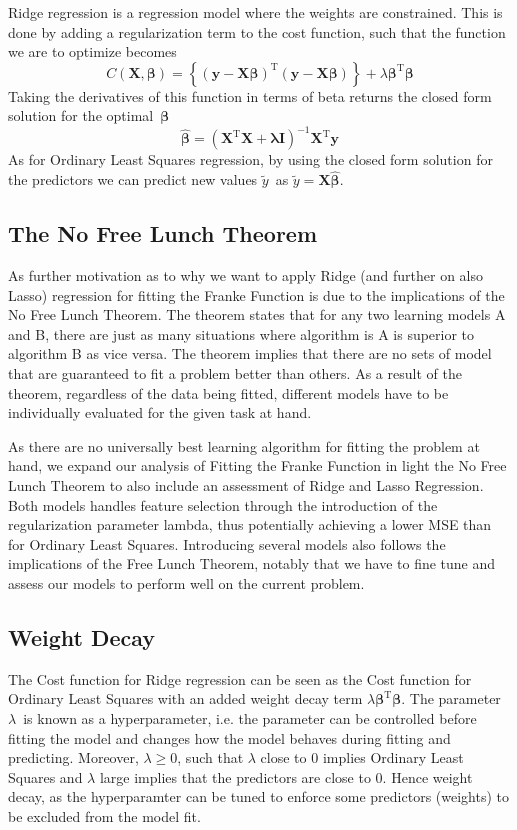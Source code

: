 \documentclass[11pt, a4paper]{article}
\begin{document}
Ridge regression is a regression model where the weights are constrained. \cite{Geron2019} This is done by adding a regularization term to the cost function, such that the function we are to optimize becomes
\[
  C\left(\bm{X},\bm{\beta}\right) = \left\{\left(\bm{y}-\bm{X}\bm{\beta}\right)^\text{T}\left(\bm{y}-\bm{X}\bm{\beta}\right)\right\}+\lambda\bm{\beta}^\text{T}\bm{\beta}
\]
Taking the derivatives of this function in terms of beta returns the closed form solution for the optimal $\bm{\beta}$
\[
  \bm{\hat{\beta}} = \left(\bm{X}^\text{T}\bm{X} + \bm{\lambda}\bm{I}\right)^{-1}\bm{X}^\text{T}\bm{y}
\]
As for Ordinary Least Squares regression, by using the closed form solution for the predictors we can predict new values $\tilde{y}$ as $\tilde{y} = \bm{X}\bm{\hat{\beta}}$.

\subsection*{The No Free Lunch Theorem}
As further motivation as to why we want to apply Ridge (and further on also Lasso) regression for fitting the Franke Function is due to the implications of the No Free Lunch Theorem. The theorem states that for any two learning models A and B, there are just as many situations where algorithm is A is superior to algorithm B as vice versa. \cite{Wolpert1996} The theorem implies that there are no sets of model that are guaranteed to fit a problem better than others. As a result of the theorem, regardless of the data being fitted, different models have to be individually evaluated for the given task at hand.

As there are no universally best learning algorithm for fitting the problem at hand, we expand our analysis of Fitting the Franke Function in light the No Free Lunch Theorem to also include an assessment of Ridge and Lasso Regression. Both models handles feature selection through the introduction of the regularization parameter lambda, thus potentially achieving a lower MSE than for Ordinary Least Squares. Introducing several models also follows the implications of the Free Lunch Theorem, notably that we have to fine tune and assess our models to perform well on the current problem. \cite{Goodfellow2016}

\subsection*{Weight Decay}
The Cost function for Ridge regression can be seen as the Cost function for Ordinary Least Squares with an added weight decay term $\lambda\bm{\beta}^\text{T}\bm{\beta}$. The parameter $\lambda$ is known as a hyperparameter, i.e. the parameter can be controlled before fitting the model and changes how the model behaves during fitting and predicting. \cite{Goodfellow2016} Moreover, $\lambda \geq 0$, such that $\lambda$ close to $0$ implies Ordinary Least Squares and $\lambda$ large implies that the predictors are close to $0$. Hence weight decay, as the hyperparamter can be tuned to enforce some predictors (weights) to be excluded from the model fit.
\end{document}
